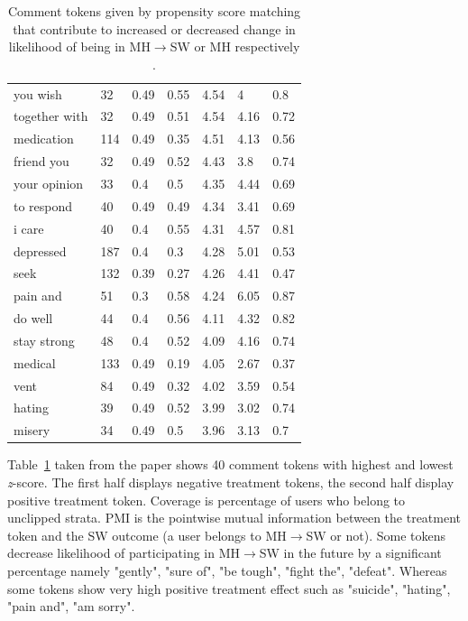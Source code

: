 \begin{table}
\begin{tabularx}{\textwidth}{>{\hsize=0.15\textwidth}X|XXXXXX}
you wish  & 32  & 0.49 &  0.55 &  4.54 &  4 &  0.8\\
together with  & 32  & 0.49 &  0.51  & 4.54  & 4.16  & 0.72\\
medication &  114 &  0.49 &  0.35 &  4.51  & 4.13 &  0.56\\
friend you &  32 &  0.49 &  0.52  & 4.43  & 3.8 &  0.74\\
your opinion &  33 &  0.4  & 0.5  & 4.35 &  4.44  & 0.69\\
to respond &  40 &  0.49  & 0.49 &  4.34  & 3.41 &  0.69\\
i care &  40  & 0.4 &  0.55  & 4.31  & 4.57 &  0.81\\
depressed &  187  & 0.4  & 0.3 &  4.28  & 5.01 &  0.53\\
seek  & 132  & 0.39  & 0.27  & 4.26  & 4.41  & 0.47\\
pain and &  51  & 0.3 &  0.58 &  4.24  & 6.05  & 0.87\\
do well  & 44 &  0.4  & 0.56  & 4.11  & 4.32 &  0.82\\
stay strong &  48 &  0.4  & 0.52  & 4.09  & 4.16 &  0.74\\
medical  & 133 &  0.49 &  0.19  & 4.05  & 2.67  & 0.37\\
vent &  84 &  0.49 &  0.32 & 4.02 &  3.59 &  0.54\\
hating &  39  & 0.49  & 0.52  & 3.99 &  3.02 &  0.74\\
misery  & 34  & 0.49 &  0.5  & 3.96 & 3.13 &  0.7\\
\bottomrule
\end{tabularx}
\caption{Comment tokens given by propensity score matching that contribute to increased or decreased change in likelihood of being in MH$\rightarrow$SW or MH respectively \cite{DeChoudhury2017}.}
\label{tab:treatment_token}
\end{table}
Table~\ref{tab:treatment_token} taken from the paper \cite{DeChoudhury2017} shows 40 comment tokens with highest and lowest \textit{z}-score. The first half displays negative treatment tokens, the second half display positive treatment token. Coverage is percentage of users who belong to unclipped strata. PMI is the pointwise mutual information between the treatment token and the SW outcome (a user belongs to MH$\rightarrow$SW or not). Some tokens decrease likelihood of participating in  MH$\rightarrow$SW in the future by a significant percentage namely "gently", "sure of", "be tough", "fight the", "defeat". Whereas some tokens show very high positive treatment effect such as "suicide", "hating", "pain and", "am sorry".  
